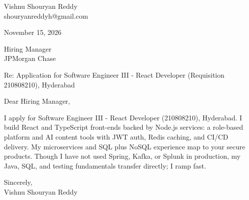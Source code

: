 \documentclass[a4paper,11pt]{article}
\begin{document}
\pagestyle{empty}
Vishnu Shouryan Reddy \\
shouryanreddyh@gmail.com

\vspace{1em}
November 15, 2026

\vspace{1em}
Hiring Manager \\
JPMorgan Chase

\vspace{1em}
Re: Application for Software Engineer III - React Developer (Requisition 210808210), Hyderabad

\vspace{1em}
Dear Hiring Manager,

\vspace{0.5em}
I apply for Software Engineer III - React Developer (210808210), Hyderabad. I build React and TypeScript front-ends backed by Node.js services: a role-based platform and AI content tools with JWT auth, Redis caching, and CI/CD delivery. My microservices and SQL plus NoSQL experience map to your secure products. Though I have not used Spring, Kafka, or Splunk in production, my Java, SQL, and testing fundamentals transfer directly; I ramp fast.

\vspace{1em}
Sincerely, \\
Vishnu Shouryan Reddy
\end{document}
